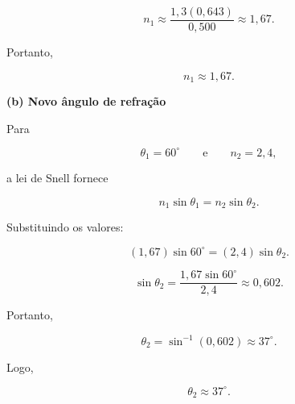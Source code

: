 \[
n_1\approx\frac{1{,}3(0{,}643)}{0{,}500}
\approx 1{,}67.
\]

Portanto,

\[
\boxed{n_1 \approx 1{,}67}.
\]

\bigskip

\textbf{(b) Novo ângulo de refração}

Para

\[
\theta_1=60^\circ
\qquad\text{e}\qquad
n_2=2{,}4,
\]

a lei de Snell fornece

\[
n_1\sin\theta_1=n_2\sin\theta_2.
\]

Substituindo os valores:

\[
(1{,}67)\sin60^\circ
=
(2{,}4)\sin\theta_2.
\]

\[
\sin\theta_2
=
\frac{1{,}67\sin60^\circ}{2{,}4}
\approx 0{,}602.
\]

Portanto,

\[
\theta_2=\sin^{-1}(0{,}602)
\approx 37^\circ.
\]

Logo,

\[
\boxed{\theta_2 \approx 37^\circ}.
\]

\vspace{1cm}
